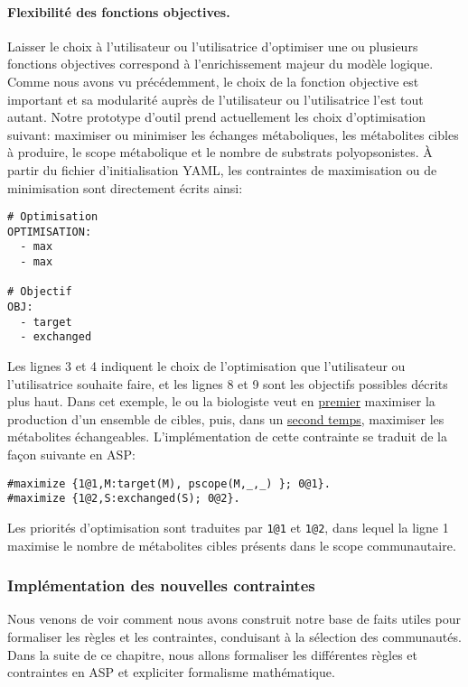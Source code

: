 \documentclass[../main.tex]{subfiles}
\begin{document}
\paragraph*{Flexibilité des fonctions objectives.}
Laisser le choix à l'utilisateur ou l'utilisatrice d'optimiser une ou plusieurs fonctions objectives correspond à l'enrichissement majeur du modèle logique. Comme nous avons vu précédemment, le choix de la fonction objective est important et sa modularité auprès de l'utilisateur ou l'utilisatrice l'est tout autant. Notre prototype d'outil prend actuellement les choix d'optimisation suivant: maximiser ou minimiser les échanges métaboliques, les métabolites cibles à produire, le scope métabolique et le nombre de substrats polyopsonistes. À partir du fichier d'initialisation YAML, les contraintes de maximisation ou de minimisation sont directement écrits ainsi:

\noindent
\begin{lstlisting}[style=yaml]
# Optimisation
OPTIMISATION: 
  - max
  - max

# Objectif
OBJ:
  - target
  - exchanged
\end{lstlisting}

Les lignes 3 et 4 indiquent le choix de l'optimisation que l'utilisateur ou l'utilisatrice souhaite faire, et les lignes 8 et 9 sont les objectifs possibles décrits plus haut. Dans cet exemple, le ou la biologiste veut en \underline{premier} maximiser la production d'un ensemble de cibles, puis, dans un \underline{second temps}, maximiser les métabolites échangeables. L'implémentation de cette contrainte se traduit de la façon suivante en ASP:\\

\begin{lstlisting}[label=lst:optimisation]
#maximize {1@1,M:target(M), pscope(M,_,_) }; 0@1}.
#maximize {1@2,S:exchanged(S); 0@2}.
\end{lstlisting}

Les priorités d'optimisation sont traduites par \texttt{1@1} et \texttt{1@2}, dans lequel la ligne 1 maximise le nombre de métabolites cibles présents dans le scope communautaire.  

\subsubsection*{Implémentation des nouvelles contraintes}
Nous venons de voir comment nous avons construit notre base de faits utiles pour formaliser les règles et les contraintes, conduisant à la sélection des communautés. Dans la suite de ce chapitre, nous allons formaliser les différentes règles et contraintes en ASP et expliciter formalisme mathématique. 
\end{document}
